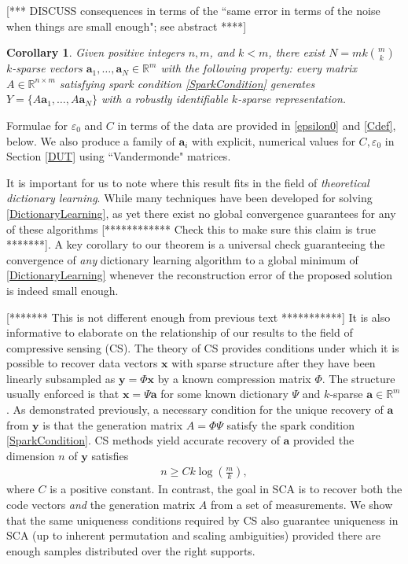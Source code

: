 \documentclass[journal, onecolumn]{IEEEtran}
\newtheorem{corollary}{Corollary}
\begin{document}
[*** DISCUSS consequences in terms of the ``same error in terms of the noise when things are small enough"; see abstract ****]

\begin{corollary}\label{DeterministicUniquenessCorollary}
Given positive integers $n, m$, and $k < m$, there exist $N =  mk{m \choose k}$ $k$-sparse vectors $\mathbf{a}_1, \ldots, \mathbf{a}_N \in \mathbb{R}^m$ with the following property: every matrix $A \in \mathbb{R}^{n \times m}$ satisfying spark condition \eqref{SparkCondition} generates $Y = \{A\mathbf{a}_1, \ldots, A\mathbf{a}_N\}$ with a robustly identifiable $k$-sparse representation.
\end{corollary}

Formulae for $\varepsilon_0$ and $C$ in terms of the data are provided in \eqref{epsilon0} and \eqref{Cdef}, below. We also produce a family of $\mathbf{a}_i$ with explicit, numerical values for $C,\varepsilon_0$ in Section \ref{DUT} using ``Vandermonde" matrices. 


It is important for us to note where this result fits in the field of \emph{theoretical dictionary learning}. While many techniques have been developed for solving \eqref{DictionaryLearning}, as yet there exist no global convergence guarantees for any of these algorithms [************ Check this to make sure this claim is true *******]. A key corollary to our theorem is a universal check guaranteeing the convergence of \emph{any} dictionary learning algorithm to a global minimum of \eqref{DictionaryLearning} whenever the reconstruction error of the proposed solution is indeed small enough. 

[*******  This is not different enough from previous text ***********]
It is also informative to elaborate on the relationship of our results to the field of compressive sensing (CS). The theory of CS provides conditions under which it is possible to recover data vectors $\mathbf{x}$ with sparse structure after they have been linearly subsampled as $\mathbf{y} = \Phi \mathbf{x}$ by a known compression matrix $\Phi$. The structure usually enforced is that $\mathbf{x} = \Psi \mathbf{a}$ for some known dictionary $\Psi$ and $k$-sparse $\mathbf{a} \in \mathbb{R}^m$. As demonstrated previously, a necessary condition for the unique recovery of $\mathbf{a}$ from $\mathbf{y}$ is that the generation matrix $A = \Phi\Psi$ satisfy the spark condition \eqref{SparkCondition}. CS methods yield accurate recovery of $\mathbf{a}$ provided the dimension $n$ of $\mathbf{y}$ satisfies
\begin{align}\label{CScondition}
n \geq Ck\log\left(\frac{m}{k}\right),
\end{align}
%
where $C$ is a positive constant. In contrast, the goal in SCA is to recover both the code vectors \emph{and} the generation matrix $A$ from a set of measurements. We show that the same uniqueness conditions required by CS also guarantee uniqueness in SCA (up to inherent permutation and scaling ambiguities) provided there are enough samples distributed over the right supports.
\end{document}
